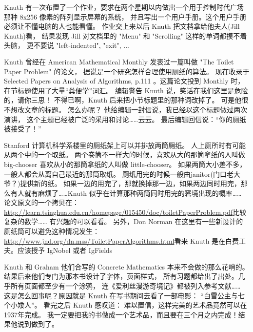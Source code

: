 Knuth 有一次布置了一个作业，要求在两个星期以内做出一个用于控制时代广场那种 8x256 像素的阵列显示屏幕的系统， 并且写出一个用户手册。这个用户手册必须让不懂电脑的人也能看懂。 作业交上来以后 Knuth 把文档拿给他夫人(Jill Knuth)看， 结果发现 Jill 对文档里的 "Menu" 和 "Scrolling" 这样的单词都摸不着头脑， 更不要说 "left-indented", "exit", ... 



Knuth 曾经在 American Mathematical Monthly 发表过一篇叫做 "The Toilet Paper Problem" 的论文， 据说是一个研究怎样合理使用厕纸的算法。 现在收录于 Selected Papers on Analysis of Algorithms, p.111 。这篇论文投到 Monthly 时，在节标题使用了大量“粪便学”词汇。 编辑警告 Knuth 说，笑话在我们这里是危险的，请你三思！ 不得已啊，Knuth 后来把小节标题里的那种词改掉了。 可是他很不想改文章的标题。 怎么办呢？ 他给编辑一封信说，我已经以这个标题做过两次演讲， 这个主题已经被广泛的采用和讨论……云云。 最后编辑回信说：“你的厕纸被接受了！” 


Stanford 计算机科学系楼里的厕纸架上可以并排放两筒厕纸。 人上厕所时有可能从两个中的一个取纸。 两个卷筒不一样大的时候，喜欢从大的那筒拿纸的人叫做 big-chooser 喜欢从小的那筒拿纸的人叫做 little-chooser。 如果两筒大小差不多，一般人都会从离自己最近的那筒取纸。 厕纸用完的时候一般由janitor(门口老大爷？)提供新的纸。 如果一边的用完了，那就换掉那一边，如果两边同时用完，那么有人就有麻烦了……Knuth 似乎在计算那种两筒同时用完的窘境出现的概率…… 论文原文的一个拷贝在： \url{http://learn.tsinghua.edu.cn/homepage/015450/doc/toiletPaperProblem.pdf}比较复杂的数学…… 有兴趣的可以看看。 另外，Don Norman 在这里有一些新设计的厕纸筒可以避免这种情况发生： \url{http://www.jnd.org/dn.mss/ToiletPaperAlgorithms.html}看来 Knuth 是在白费工夫。应该授予 IgNobel 或者 IgFields 


Knuth 和 Graham 他们合写的 Concrete Mathematics 本来不会做的那么花哨的。结果后来他们专门为那本书设计了字体，页面样式， 所有习题都给出了出处。几乎所有页面都至少有一个涂鸦， 连《爱利丝漫游奇境记》都被列入参考文献…… 这是怎么回事呢？原因就是 Knuth 在写书期间去看了一部电影： “白雪公主与七个小矮人”。 看完之后 Knuth 感叹道： 难以置信，这样完美的艺术品竟然可以在1937年完成。 我一定要把我的书做成一个艺术品，而且要在三个月之内完成！结果他说到做到了。